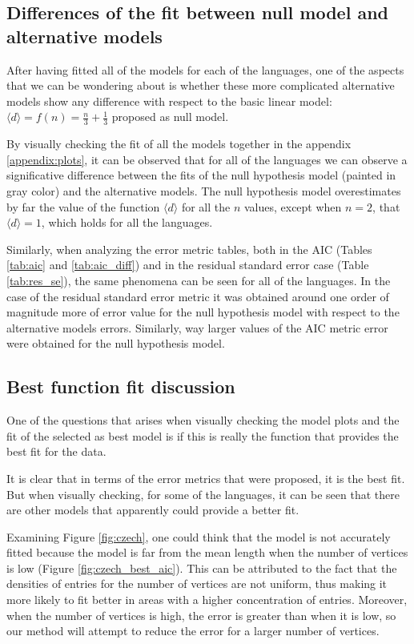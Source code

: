 
\subsection{Differences of the fit between null model and alternative models}

After having fitted all of the models for each of the languages, one of the aspects that we can be wondering about is whether these more complicated alternative models show any difference with respect to the basic linear model: $\langle  d \rangle = f(n) = \frac{n}{3} + \frac{1}{3}$ proposed as null model. 

By visually checking the fit of all the models together in the appendix \ref{appendix:plots}, it can be observed that for all of the languages we can observe a significative difference between the fits of the null hypothesis model (painted in gray color) and the alternative models. The null hypothesis model overestimates by far the value of the function $\langle  d \rangle$ for all the $n$ values, except when $n=2$, that $\langle  d \rangle = 1$, which holds for all the languages.

Similarly, when analyzing the error metric tables, both in the AIC (Tables \ref{tab:aic} and \ref{tab:aic_diff}) and in the residual standard error case (Table \ref{tab:res_se}), the same phenomena can be seen for all of the languages. In the case of the residual standard error metric it was obtained around one order of magnitude more of error value for the null hypothesis model with respect to the alternative models errors. Similarly, way larger values of the AIC metric error were obtained for the null hypothesis model.

\subsection{Best function fit discussion}\label{discussion:bestfit}

One of the questions that arises when visually checking the model plots and the fit of the selected as best model is if this is really the function that provides the best fit for the data. 

It is clear that in terms of the error metrics that were proposed, it is the best fit. But when visually checking, for some of the languages, it can be seen that there are other models that apparently could provide a better fit.

Examining Figure \ref{fig:czech}, one could think that the model is not accurately fitted because the model is far from the mean length when the number of vertices is low (Figure \ref{fig:czech_best_aic}). This can be attributed to the fact that the densities of entries for the number of vertices are not uniform, thus making it more likely to fit better in areas with a higher concentration of entries. Moreover, when the number of vertices is high, the error is greater than when it is low, so our method will attempt to reduce the error for a larger number of vertices.

